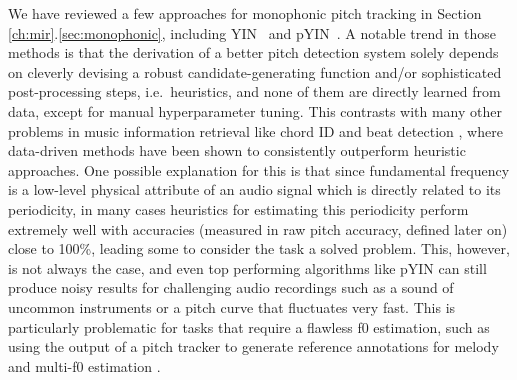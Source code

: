We have reviewed a few approaches for monophonic pitch tracking in Section \ref{ch:mir}.\ref{sec:monophonic}, including YIN~\cite{decheveigne2002yin} and pYIN~\cite{mauch2014pyin}.
A notable trend in those methods is that the derivation of a better pitch detection system solely depends on cleverly devising a robust candidate-generating function and/or sophisticated post-processing steps, i.e.~heuristics, and none of them are directly learned from data, except for manual hyperparameter tuning.
This contrasts with many other problems in music information retrieval like chord ID \cite{humphrey2012rethinking} and beat detection \cite{bock2011enhanced}, where data-driven methods have been shown to consistently outperform heuristic approaches.
One possible explanation for this is that since fundamental frequency is a low-level physical attribute of an audio signal which is directly related to its periodicity, in many cases heuristics for estimating this periodicity perform extremely well with accuracies (measured in raw pitch accuracy, defined later on) close to 100\%, leading some to consider the task a solved problem.
This, however, is not always the case, and even top performing algorithms like pYIN can still produce noisy results for challenging audio recordings such as a sound of uncommon instruments or a pitch curve that fluctuates very fast.
This is particularly problematic for tasks that require a flawless f0 estimation, such as using the output of a pitch tracker to generate reference annotations for melody and multi-f0 estimation \cite{salamon2017analysis,bittner2017deepsalience}.

